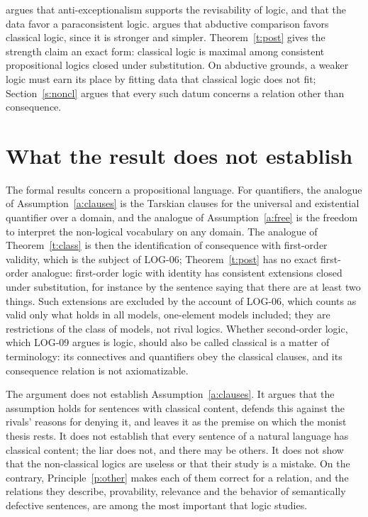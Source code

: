 \documentclass{situationist-preprint}
\begin{document}
\citet{Hjortland2017} argues that anti-exceptionalism supports the revisability of logic, and \citet{Priest2014} that the data favor a paraconsistent logic. \citet{Williamson2017} argues that abductive comparison favors classical logic, since it is stronger and simpler. Theorem~\ref{t:post} gives the strength claim an exact form: classical logic is maximal among consistent propositional logics closed under substitution. On abductive grounds, a weaker logic must earn its place by fitting data that classical logic does not fit; Section~\ref{s:noncl} argues that every such datum concerns a relation other than consequence.

\section{What the result does not establish}\label{s:limits}

The formal results concern a propositional language. For quantifiers, the analogue of Assumption~\ref{a:clauses} is the Tarskian clauses for the universal and existential quantifier over a domain, and the analogue of Assumption~\ref{a:free} is the freedom to interpret the non-logical vocabulary on any domain. The analogue of Theorem~\ref{t:class} is then the identification of consequence with first-order validity, which is the subject of LOG-06; Theorem~\ref{t:post} has no exact first-order analogue: first-order logic with identity has consistent extensions closed under substitution, for instance by the sentence saying that there are at least two things. Such extensions are excluded by the account of LOG-06, which counts as valid only what holds in all models, one-element models included; they are restrictions of the class of models, not rival logics. Whether second-order logic, which LOG-09 argues is logic, should also be called classical is a matter of terminology: its connectives and quantifiers obey the classical clauses, and its consequence relation is not axiomatizable.

The argument does not establish Assumption~\ref{a:clauses}. It argues that the assumption holds for sentences with classical content, defends this against the rivals' reasons for denying it, and leaves it as the premise on which the monist thesis rests. It does not establish that every sentence of a natural language has classical content; the liar does not, and there may be others. It does not show that the non-classical logics are useless or that their study is a mistake. On the contrary, Principle~\ref{p:other} makes each of them correct for a relation, and the relations they describe, provability, relevance and the behavior of semantically defective sentences, are among the most important that logic studies.
\end{document}
